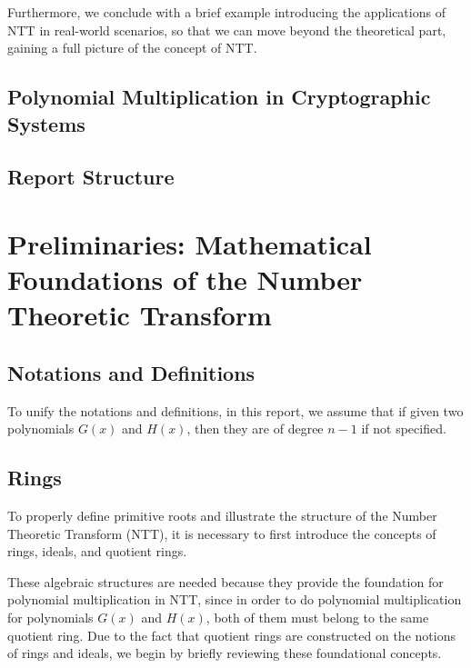 \documentclass[12pt]{article}
\begin{document}
Furthermore, 
we conclude with a brief example introducing the applications of NTT in real-world scenarios, 
so that we can move beyond the theoretical part, gaining a full picture of the concept of NTT.

\subsection{Polynomial Multiplication in Cryptographic Systems}

\subsection{Report Structure}

\section{Preliminaries: Mathematical Foundations of the Number Theoretic Transform}
\subsection{Notations and Definitions}

To unify the notations and definitions, in this report, we assume that if
given two polynomials $G(x)$ and $H(x)$, then they are of degree $n-1$ if not specified.

\subsection{Rings}

To properly define primitive roots and illustrate the structure of the Number Theoretic Transform (NTT), 
it is necessary to first introduce the concepts of rings, ideals, and quotient rings. 

These algebraic structures are needed because they provide the foundation for polynomial multiplication in NTT, 
since in order to do polynomial multiplication for polynomials $G(x)$ and $H(x)$, 
both of them must belong to the same quotient ring. 
Due to the fact that quotient rings are constructed on the notions of rings and ideals, 
we begin by briefly reviewing these foundational concepts.
\end{document}
